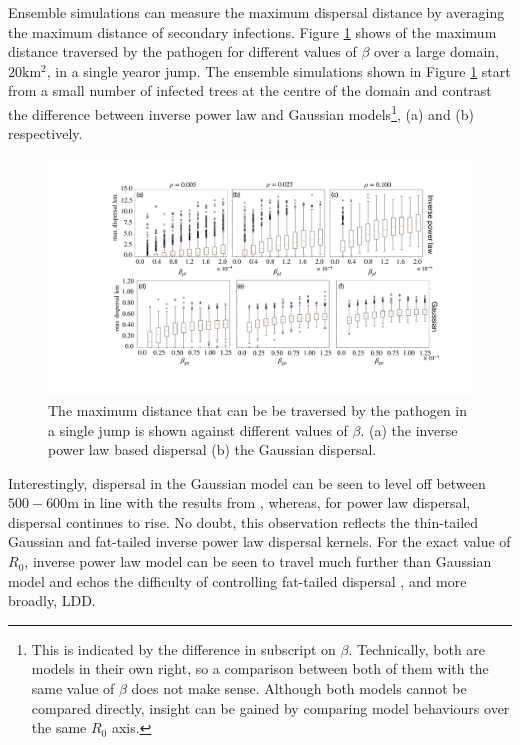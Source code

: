 Ensemble simulations can measure the maximum dispersal distance by averaging the maximum distance of secondary infections. Figure \ref{fig:max_dist_vs_R0} shows of the maximum distance traversed by the pathogen for different values of $\beta$ over a large domain, $20\mathrm{km^2}$, in a single year\textemdash or jump. The ensemble simulations shown in Figure \ref{fig:max_dist_vs_R0} start from a small number of infected trees at the centre of the domain and contrast the difference between inverse power law and Gaussian models\footnote{This is indicated by the difference in subscript on $\beta$. Technically, both are models in their own right, so a comparison between both of them with the same value of $\beta$ does not make sense. Although both models cannot be compared directly, insight can be gained by comparing model behaviours over the same $R_0$ axis.}, (a) and (b) respectively. 
\begin{figure}
    \centering
    \includegraphics[scale=0.33]{chapter6/figures/fig5-beta-vs-max_d.pdf}
    \caption{The maximum distance that can be be traversed by the pathogen in a single jump is shown against different values of $\beta$. (a) the inverse power law based dispersal (b) the Gaussian dispersal.}  %
    \label{fig:max_dist_vs_R0}
\end{figure}

Interestingly, dispersal in the Gaussian model can be seen to level off between $500-600\mathrm{m}$ in line with the results from \cite{grosdidier2018tracking}, whereas, for power law dispersal, dispersal continues to rise. No doubt, this observation reflects the thin-tailed Gaussian and fat-tailed inverse power law dispersal kernels. For the exact value of $R_0$, inverse power law model can be seen to travel much further than Gaussian model and echos the difficulty of controlling fat-tailed dispersal \cite{WEBIDEMICS}, and more broadly, LDD.

